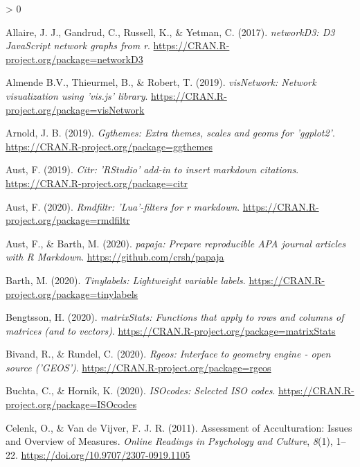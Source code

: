 \documentclass[
  american,
  man]{apa7}
\newlength{\cslhangindent}
\newenvironment{CSLReferences}[2] %
 {%
  \setlength{\parindent}{0pt}
  \ifodd #1 \everypar{\setlength{\hangindent}{\cslhangindent}}\ignorespaces\fi
  \ifnum #2 > 0
  \setlength{\parskip}{#2\baselineskip}
  \fi
 }%
 {}
\begin{document}
\begin{CSLReferences}{1}{0}
\leavevmode\hypertarget{ref-R-networkD3}{}%
Allaire, J. J., Gandrud, C., Russell, K., \& Yetman, C. (2017). \emph{networkD3: D3 JavaScript network graphs from r}. \url{https://CRAN.R-project.org/package=networkD3}

\leavevmode\hypertarget{ref-R-visNetwork}{}%
Almende B.V., Thieurmel, B., \& Robert, T. (2019). \emph{visNetwork: Network visualization using 'vis.js' library}. \url{https://CRAN.R-project.org/package=visNetwork}

\leavevmode\hypertarget{ref-R-ggthemes}{}%
Arnold, J. B. (2019). \emph{Ggthemes: Extra themes, scales and geoms for 'ggplot2'}. \url{https://CRAN.R-project.org/package=ggthemes}

\leavevmode\hypertarget{ref-R-citr}{}%
Aust, F. (2019). \emph{Citr: 'RStudio' add-in to insert markdown citations}. \url{https://CRAN.R-project.org/package=citr}

\leavevmode\hypertarget{ref-R-rmdfiltr}{}%
Aust, F. (2020). \emph{Rmdfiltr: 'Lua'-filters for r markdown}. \url{https://CRAN.R-project.org/package=rmdfiltr}

\leavevmode\hypertarget{ref-R-papaja}{}%
Aust, F., \& Barth, M. (2020). \emph{{papaja}: {Prepare} reproducible {APA} journal articles with {R Markdown}}. \url{https://github.com/crsh/papaja}

\leavevmode\hypertarget{ref-R-tinylabels}{}%
Barth, M. (2020). \emph{Tinylabels: Lightweight variable labels}. \url{https://CRAN.R-project.org/package=tinylabels}

\leavevmode\hypertarget{ref-R-matrixStats}{}%
Bengtsson, H. (2020). \emph{matrixStats: Functions that apply to rows and columns of matrices (and to vectors)}. \url{https://CRAN.R-project.org/package=matrixStats}

\leavevmode\hypertarget{ref-R-rgeos}{}%
Bivand, R., \& Rundel, C. (2020). \emph{Rgeos: Interface to geometry engine - open source ('GEOS')}. \url{https://CRAN.R-project.org/package=rgeos}

\leavevmode\hypertarget{ref-R-ISOcodes}{}%
Buchta, C., \& Hornik, K. (2020). \emph{ISOcodes: Selected ISO codes}. \url{https://CRAN.R-project.org/package=ISOcodes}

\leavevmode\hypertarget{ref-Celenk2011}{}%
Celenk, O., \& Van de Vijver, F. J. R. (2011). {Assessment of Acculturation: Issues and Overview of Measures}. \emph{Online Readings in Psychology and Culture}, \emph{8}(1), 1--22. \url{https://doi.org/10.9707/2307-0919.1105}


\end{CSLReferences}
\end{document}
